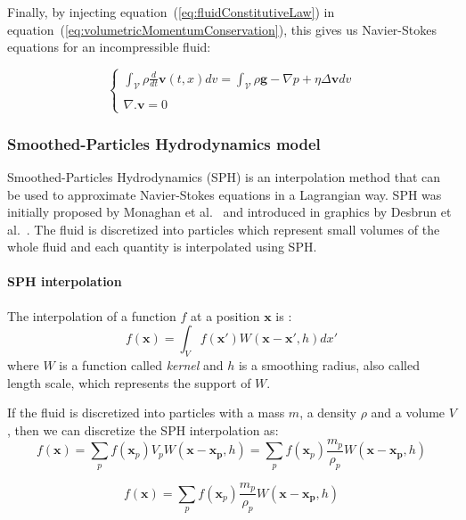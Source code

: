 Finally, by injecting equation~(\ref{eq:fluidConstitutiveLaw}) in equation~(\ref{eq:volumetricMomentumConservation}), this gives us Navier-Stokes equations for an incompressible fluid:

\begin{equation}
\label{eq:navierStokes}
\left\lbrace
\begin{array}{ll}
\displaystyle \int_{\mathcal{V}} \rho \frac{d}{dt} \mathbf{v}(t,x) dv = 
\displaystyle \int_{\mathcal{V}} \rho \mathbf{g} -\nabla p + \eta \Delta \mathbf{v} dv \\ \\
\displaystyle
\nabla. \mathbf{v} = 0
\end{array}
\right.
\end{equation}

\subsubsection{Smoothed-Particles Hydrodynamics model}
\label{subsubsec:starSPH}
Smoothed-Particles Hydrodynamics (SPH) is an interpolation method that can be used to approximate Navier-Stokes equations in a Lagrangian way. SPH was initially proposed by Monaghan et al.~\cite{Monaghan1992} and introduced in graphics by Desbrun et al.~\cite{Desbrun1999}.
The fluid is discretized into particles which represent small volumes of the whole fluid and each quantity is interpolated using SPH.

\paragraph{SPH interpolation}
The interpolation of a function $f$ at a position $\mathbf{x}$ is :
\begin{equation}
f(\mathbf{x}) = \int_{V} f(\mathbf{x'})W(\mathbf{x}-\mathbf{x'}, h)dx'
\end{equation}
where $W$ is a function called \emph{kernel} and $h$ is a smoothing radius, also called length scale, which represents the support of $W$.

If the fluid is discretized into particles with a mass $m$, a density $\rho$ and a volume $V$, then we can discretize the SPH interpolation as:
\begin{equation}
f(\mathbf{x}) = \sum_{p} f(\mathbf{x}_{p})V_{p} W(\mathbf{x}-\mathbf{x_{p}},h) = \sum_{p} f(\mathbf{x}_{p})\frac{m_{p}}{\rho_{p}} W(\mathbf{x}-\mathbf{x_{p}},h)
\end{equation}

\begin{equation}
\label{eq:sphFunction}
f(\mathbf{x}) = \sum_{p} f(\mathbf{x}_{p})\frac{m_{p}}{\rho_{p}} W(\mathbf{x}-\mathbf{x_{p}},h)
\end{equation}

